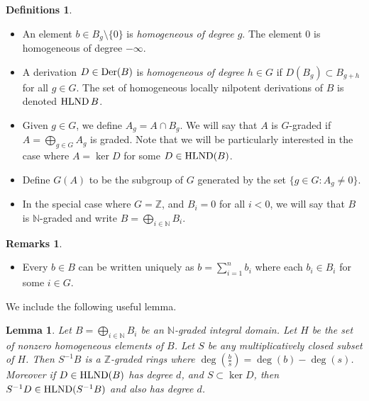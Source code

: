 \documentclass[12pt]{amsart}
\theoremstyle{plain}
\newtheorem{lemma}[subsection]{Lemma}
\theoremstyle{definition}
\newtheorem{definitions}[subsection]{Definitions}
\newtheorem{remarks}[subsection]{Remarks}
\newcommand{\Der}{		\operatorname{{\rm Der}}}
\newcommand{\Integ}{\ensuremath{\mathbb{Z}}}
\newcommand{\Nat}{\ensuremath{\mathbb{N}}}
\newcommand{\hlnd}{\operatorname{{\rm HLND}}}
\begin{document}
\begin{definitions} 
	
\begin{itemize}
	
	\item An element $b \in B_g \setminus\{0\}$ is \textit{homogeneous of degree $g$}. The element 0 is homogeneous of degree $-\infty$. 
	
	\item A derivation $D \in \Der(B)$ is  \textit{homogeneous of degree $h \in G$} if $D(B_g) \subset B_{g+h}$ for all $g \in G$. The set of homogeneous locally nilpotent derivations of $B$ is denoted $\hlnd B$. 
	
	\item Given $g \in G$, we define $A_g = A \cap B_g$. We will say that $A$ is $G$-graded if $A = \bigoplus\limits_{g \in G} A_g$ is graded. Note that we will be particularly interested in the case where $A = \ker D$ for some $D \in \hlnd(B)$. 
	
	\item Define $G(A)$ to be the subgroup of $G$ generated by the set $\{g \in G : A_g \neq 0\}$. 
	
	\item In the special case where $G = \Integ$, and $B_i = 0$ for all $i < 0$, we will say that $B$ is $\Nat$-graded and write $B = \bigoplus\limits_{i \in \Nat} B_i$. 
	
	
\end{itemize}



\end{definitions}  
\begin{remarks}
	\begin{itemize}
		\item Every $b \in B$ can be written uniquely as $b = \sum \limits_{i=1}^n b_i$ where each $b_i \in B_i$ for some $i \in G$. 		
		 
	\end{itemize} 	
\end{remarks}

We include the following useful lemma. 

\begin{lemma}\label{homoLoc}
	Let $B = \bigoplus\limits_{i \in \Nat} B_i$ be an $\Nat$-graded integral domain. Let $H$ be the set of nonzero homogeneous elements of $B$. Let $S$ be any multiplicatively closed subset of $H$. Then $S^{-1}B$ is a $\Integ$-graded rings where $\deg(\frac{b}{s}) = \deg(b) - \deg(s)$. Moreover if $D \in \hlnd(B)$ has degree $d$,  and $S \subset \ker D$, then $S^{-1}D \in \hlnd(S^{-1}B)$ and also has degree $d$.  
\end{lemma}
\end{document}
